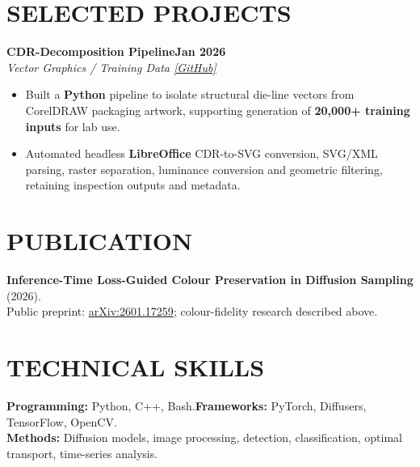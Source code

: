 \documentclass[10pt,a4paper]{article}
\newcommand{\entry}[3]{\noindent\textbf{#1}\hfill\textbf{#3}\\[-1pt]\textit{#2}\par}
\newenvironment{cvitems}{\begin{itemize}[leftmargin=1.1em,label=\textbullet,itemsep=2pt,topsep=3pt,parsep=0pt,partopsep=0pt]}{\end{itemize}}
\begin{document}
\section{SELECTED PROJECTS}
\entry{CDR-Decomposition Pipeline}{Vector Graphics / Training Data \href{https://github.com/MushuRam01/CDR-Decomposition}{[GitHub]}}{Jan 2026}
\begin{cvitems}
  \item Built a \textbf{Python} pipeline to isolate structural die-line vectors from CorelDRAW packaging artwork, supporting generation of \textbf{20,000+ training inputs} for lab use.
  \item Automated headless \textbf{LibreOffice} CDR-to-SVG conversion, SVG/XML parsing, raster separation, luminance conversion and geometric filtering, retaining inspection outputs and metadata.
\end{cvitems}
\section{PUBLICATION}
\textbf{Inference-Time Loss-Guided Colour Preservation in Diffusion Sampling} (2026).\\
Public preprint: \href{https://arxiv.org/abs/2601.17259}{arXiv:2601.17259}; colour-fidelity research described above.
\section{TECHNICAL SKILLS}
\textbf{Programming:} Python, C++, Bash.\quad \textbf{Frameworks:} PyTorch, Diffusers, TensorFlow, OpenCV.\\\textbf{Methods:} Diffusion models, image processing, detection, classification, optimal transport, time-series analysis.
\end{document}
